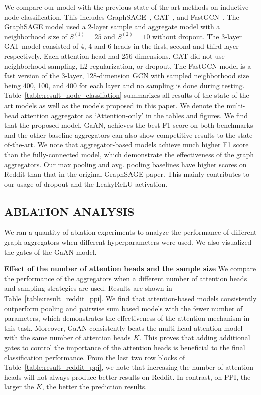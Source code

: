 \documentclass{article}
\begin{document}
	We compare our model with the previous state-of-the-art methods on inductive node classification. 
	This includes GraphSAGE~\citep{hamilton2017inductive}, GAT~\citep{velivckovic2017graph},
	and FastGCN~\citep{chen2018fastgcn}. 
	The GraphSAGE model used a 2-layer sample and aggregate model with a neighborhood size of $S^{(1)}=25$ and $S^{(2)}=10$ without dropout. 
	The 3-layer GAT model consisted of 4, 4 and 6 heads in the first, second and third layer respectively. Each attention head had 256 dimensions. GAT did not use neighborhood sampling, L2 regularization, or dropout. 
	The FastGCN model is a fast version of the 3-layer, 128-dimension GCN with sampled neighborhood size being 400, 100, and 400 for each layer and no sampling is done during testing.
	Table~\ref{table:result_node_classifation} summarizes all results of the state-of-the-art models as well as the models proposed in this paper. We denote the multi-head attention aggregator as `Attention-only' in the tables and figures. We find that the proposed model, GaAN, achieves the best F1 score on both benchmarks and the other baseline aggregators can also show competitive results to the state-of-the-art. We note that aggregator-based models achieve much higher F1 score than the fully-connected model, which demonstrate the effectiveness of the graph aggregators. Our max pooling and avg. pooling baselines have higher scores on Reddit than that in the original GraphSAGE paper. This mainly contributes to our usage of dropout and the LeakyReLU activation.
	
	
	
	
	\subsection{ABLATION ANALYSIS}
	We ran a quantity of ablation experiments to analyze the performance of different graph aggregators when different hyperparameters were used. We also visualized the gates of the GaAN model.
	
	\textbf{Effect of the number of attention heads and the sample size}\quad
	We compare the performance of the aggregators when a different number of attention heads and sampling strategies are used. Results are shown in Table~\ref{table:result_reddit_ppi}.
	We find that attention-based models consistently outperform pooling and pairwise sum based models with the fewer number of parameters, which demonstrates the effectiveness of the attention mechanism in this task. Moreover, GaAN consistently beats the multi-head attention model with the same number of attention heads $K$. This proves that adding additional gates to control the importance of the attention heads is beneficial to the final classification performance. From the last two row blocks of Table~\ref{table:result_reddit_ppi}, we note that increasing the number of attention heads will not always produce better results on Reddit. In contrast, on PPI, the larger the $K$, the better the prediction results. 
\end{document}
